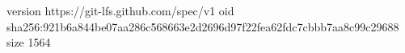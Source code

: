 version https://git-lfs.github.com/spec/v1
oid sha256:921b6a844be07aa286c568663e2d2696d97f22fea62fdc7cbbb7aa8c99c29688
size 1564
